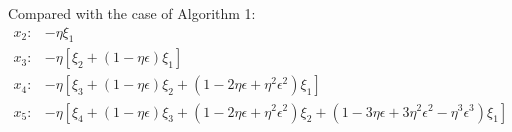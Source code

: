 \documentclass[11pt,letterpaper,english]{article}
\begin{document}
Compared with the case of Algorithm 1:
\begin{align*}
x_2: &-\eta  \xi_1 \\
x_3: &-\eta  \left[ \xi_2 + \left( 1- \eta \epsilon\right)\xi_1\right]\\
x_4: &-\eta  \left[ \xi_3 + \left( 1- \eta \epsilon\right)\xi_2+ \left( 1- 2\eta \epsilon+\eta^2 \epsilon^2\right)\xi_1\right]\\
x_5: &-\eta  \left[ \xi_4 + \left( 1- \eta \epsilon\right)\xi_3+ \left( 1- 2\eta \epsilon+\eta^2 \epsilon^2\right)\xi_2+ \left( 1- 3\eta \epsilon+3\eta^2 \epsilon^2-\eta^3 \epsilon^3\right)\xi_1\right]
\end{align*}
\end{document}
